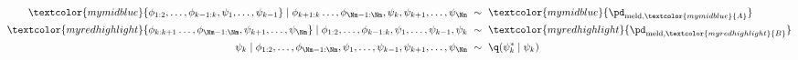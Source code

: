 \begin{align}
  \textcolor{mymidblue}{
    \phi_{1:2}, \ldots, \phi_{k - 1:k},
    \psi_{1}, \ldots, \psi_{k - 1}
  }
    \mid
    \phi_{k + 1:k} \ldots, \phi_{\Nm - 1:\Nm},
    \psi_{k},
    \psi_{k + 1}, \ldots, \psi_{\Nm} 
  \,\, &\sim \,\, 
    \textcolor{mymidblue}{
      \pd_{\text{meld}, \textcolor{mymidblue}{A}}
    }
   \\
  \textcolor{myredhighlight}{
    \phi_{k:k + 1} \ldots, \phi_{\Nm - 1:\Nm},
    \psi_{k + 1}, \ldots, \psi_{\Nm}
  }
    \mid
    \phi_{1:2}, \ldots, \phi_{k - 1:k},
    \psi_{1}, \ldots, \psi_{k - 1},
    \psi_{k}
   \,\, &\sim \,\, 
    \textcolor{myredhighlight}{
      \pd_{\text{meld}, \textcolor{myredhighlight}{B}}
    }
   \\
  \psi_{k} 
  \mid 
  \phi_{1:2}, \ldots, \phi_{\Nm - 1:\Nm},
  \psi_{1}, \ldots, \psi_{k-1}, \psi_{k + 1}, \ldots, \psi_{\Nm} 
  \,\, &\sim \,\, 
  \q(\psi_{k}^{*} \mid \psi_{k})
  \label{eqn:dc-gibbs-updates}
\end{align}